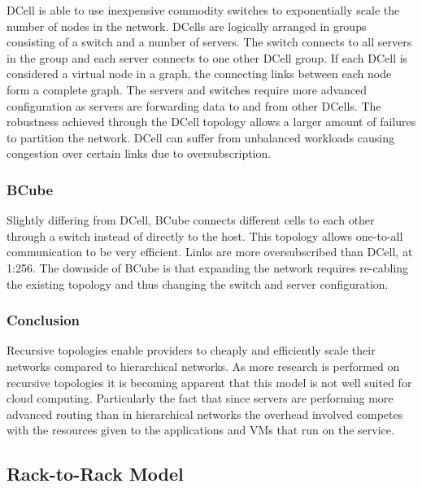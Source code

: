 \documentclass[12pt]{article}
\begin{document}
DCell is able to use inexpensive commodity switches to exponentially scale the number of nodes in the network. DCells are logically arranged in groups consisting of a switch and a number of servers. The switch connects to all servers in the group and each server connects to one other DCell group. If each DCell is considered a virtual node in a graph, the connecting links between each node form a complete graph. The servers and switches require more advanced configuration as servers are forwarding data to and from other DCells. The robustness achieved through the DCell topology allows a larger amount of failures to partition the network. DCell can suffer from unbalanced workloads causing congestion over certain links due to oversubscription.



\subsubsection{BCube} \label{subp:bcube}

Slightly differing from DCell, BCube connects different cells to each other through a switch instead of directly to the host. This topology allows one-to-all communication to be very efficient. Links are more oversubscribed than DCell, at 1:256. The downside of BCube is that expanding the network requires re-cabling the existing topology and thus changing the switch and server configuration.


\subsubsection{Conclusion} \label{ssub:recursive-concl}



Recursive topologies enable providers to cheaply and efficiently scale their networks compared to hierarchical networks. As more research is performed on recursive topologies it is becoming apparent that this model is not well suited for cloud computing. Particularly the fact that since servers are performing more advanced routing than in hierarchical networks the overhead involved competes with the resources given to the applications and VMs that run on the service.


\subsection{Rack-to-Rack Model} \label{sub:net-rack}
\end{document}
